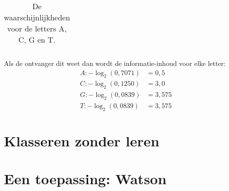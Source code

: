 \documentclass{report}
\begin{document}
\begin{itemize}
\begin{itemize}
\begin{table}[h]
\begin{tabular}{l | r}
			\end{tabular}
			\caption{De waarschijnlijkheden voor de letters A, C, G en T.}
			\label{table:example_entropy}
		\end{table}
		Als de ontvanger dit weet dan wordt de informatie-inhoud voor elke letter:
		\begin{equation*}
			\begin{split}
				A: -\log_2(0,7071) & = 0,5 \\
				C: -\log_2(0,1250) & = 3,0 \\
				G: -\log_2(0,0839) & = 3,575\\
				T: -\log_2(0,0839) & = 3,575
			\end{split}
		\end{equation*}
	\end{itemize}
\end{itemize}
\section{Klasseren zonder leren}
\section{Een toepassing: Watson}
\end{document}

